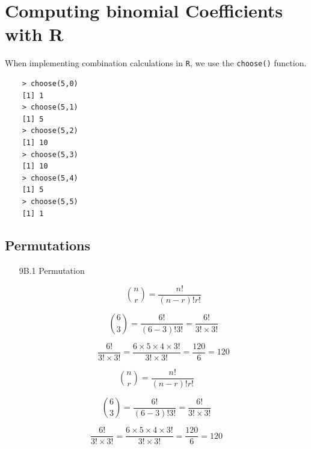 \documentclass[12pt]{report}
\begin{document}
	
\newpage
\section*{Computing binomial Coefficients with R}
When implementing combination calculations in \texttt{R}, we use the \texttt{choose()} function.
\begin{framed}	
	\begin{verbatim}
	> choose(5,0)
	[1] 1
	> choose(5,1)
	[1] 5
	> choose(5,2)
	[1] 10
	> choose(5,3)
	[1] 10
	> choose(5,4)
	[1] 5
	> choose(5,5)
	[1] 1
	\end{verbatim}
\end{framed}	
\newpage

\subsection*{Permutations}




\begin{itemize}
	\item[9B.1] Permutation
	
	\[ {n \choose r} = \frac{n!}{(n-r)! r!} \]
	
	
	\[ {6 \choose 3} = \frac{6!}{(6-3)! 3!} = \frac{6!}{3! \times 3!}\]
	
	
	\[ \frac{6!}{3! \times 3!} = \frac{6 \times 5 \times 4 \times 3!}{3! \times 3!} = \frac{120}{6} = 120\]
\end{itemize}

\begin{framed}
	
	\[ {n \choose r} = \frac{n!}{(n-r)! r!} \]
	\bigskip
	
	\[ {6 \choose 3} = \frac{6!}{(6-3)! 3!} = \frac{6!}{3! \times 3!}\]
	
	\bigskip
	\[ \frac{6!}{3! \times 3!} = \frac{6 \times 5 \times 4 \times 3!}{3! \times 3!} = \frac{120}{6} = 120\]
	\bigskip
\end{framed}
\end{document}
